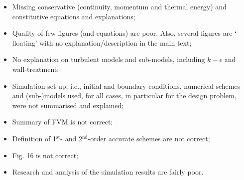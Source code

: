 \documentclass[14pt,twoside]{report}
\newcommand\blankpage{%
    \null
    \thispagestyle{empty}%
    \addtocounter{page}{-1}%
    \newpage}
\begin{document}
\clearpage






\clearpage




\bigskip


\medskip

  \begin{itemize}
%
     \item Missing conservative (continuity, momentum and thermal energy) and constitutive equations and explanations;
     \item Quality of few figures (and equations) are poor. Also, several figures are $\lq$floating' with no explanation/description in the main text;
     \item No explanation on turbulent models and sub-models, including $k-\epsilon$ and wall-treatment;
     \item Simulation set-up, i.e., initial and boundary conditions, numerical schemes and (sub-)models used, for all cases, in particular for the design problem, were not summarised and explained;
     \item Summary of FVM is not correct;
     \item Definition of 1$^{\text{st}}$- and 2$^{\text{nd}}$-order accurate schemes are not correct;
     \item Fig. 16 is not correct;
     \item Research and analysis of the simulation results are fairly poor.
%
  \end{itemize}%
\clearpage
\end{document}
